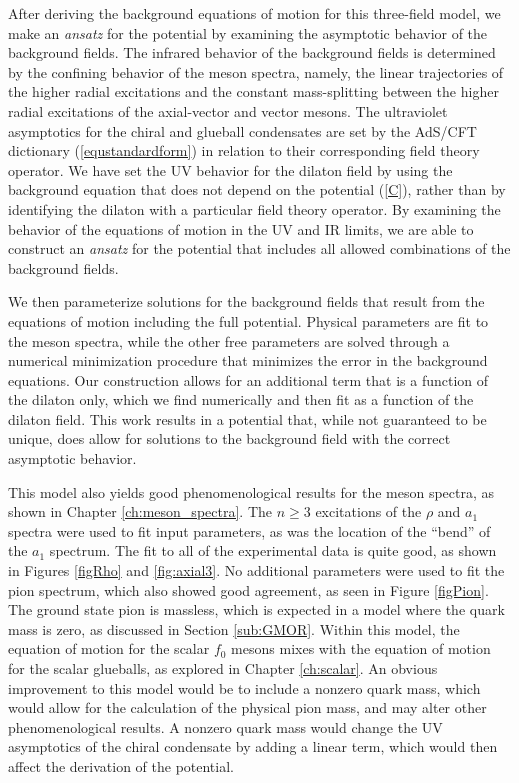 After deriving the background equations of motion for this three-field model, we make an \emph{ansatz} for the potential by examining the asymptotic behavior of the background fields.
The infrared behavior of the background fields is determined by the confining behavior of the meson spectra, namely, the linear trajectories of the higher radial excitations and the constant mass-splitting between the higher radial excitations of the axial-vector and vector mesons.
The ultraviolet asymptotics for the chiral and glueball condensates are set by the AdS/CFT dictionary (\ref{equstandardform}) in relation to their corresponding field theory operator.
We have set the UV behavior for the dilaton field by using the background equation that does not depend on the potential (\ref{C}), rather than by identifying the dilaton with a particular field theory operator. 
By examining the behavior of the equations of motion in the UV and IR limits, we are able to construct an \emph{ansatz} for the potential that includes all allowed combinations of the background fields.

We then parameterize solutions for the background fields that result from the equations of motion including the full potential.
Physical parameters are fit to the meson spectra, while the other free parameters are solved through a numerical minimization procedure that minimizes the error in the background equations.
Our construction allows for an additional term that is a function of the dilaton only, which we find numerically and then fit as a function of the dilaton field.
This work results in a potential that, while not guaranteed to be unique, does allow for solutions to the background field with the correct asymptotic behavior.

This model also yields good phenomenological results for the meson spectra, as shown in Chapter \ref{ch:meson_spectra}.
The $n\ge3$ excitations of the $\rho$ and $a_1$ spectra were used to fit input parameters, as was the location of the ``bend'' of the $a_1$ spectrum.
The fit to all of the experimental data is quite good, as shown in Figures \ref{figRho} and \ref{fig:axial3}.
No additional parameters were used to fit the pion spectrum, which also showed good agreement, as seen in Figure \ref{figPion}.
The ground state pion is massless, which is expected in a model where the quark mass is zero, as discussed in Section \ref{sub:GMOR}.
Within this model, the equation of motion for the scalar $f_0$ mesons mixes with the equation of motion for the scalar glueballs, as explored in Chapter \ref{ch:scalar}.
An obvious improvement to this model would be to include a nonzero quark mass, which would allow for the calculation of the physical pion mass, and may alter other phenomenological results.
A nonzero quark mass would change the UV asymptotics of the chiral condensate by adding a linear term, which would then affect the derivation of the potential.

